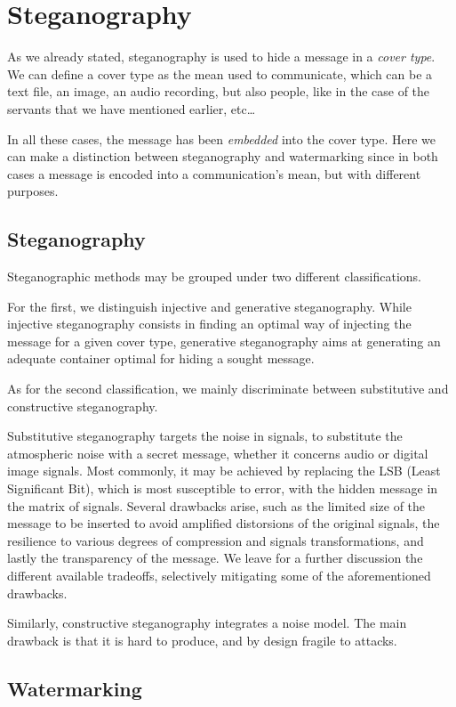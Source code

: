 \documentclass[../../main.tex]{subfiles}
\begin{document}
\section{Steganography}

As we already stated, steganography is used to hide a message in a
\emph{cover type}. We can define a cover type as the mean used to communicate,
which can be a text file, an image, an audio recording, but also people, like in
the case of the servants that we have mentioned earlier, etc\dots

In all these cases, the message has been \emph{embedded} into the cover type.
Here we can make a distinction between steganography and watermarking since in
both cases a message is encoded into a communication's mean, but with different
purposes.

\subsection{Steganography}

Steganographic methods may be grouped under two different classifications.

For the first, we distinguish injective and generative steganography.
While injective steganography consists in finding an optimal way of injecting
the message for a given cover type, generative steganography aims at generating
an adequate container optimal for hiding a sought message.

As for the second classification, we mainly discriminate between substitutive
and constructive steganography.

Substitutive steganography targets the noise in signals, to substitute the
atmospheric noise with a secret message, whether it concerns audio or digital
image signals.
Most commonly, it may be achieved by replacing the LSB (Least Significant Bit),
which is most susceptible to error, with the hidden message in the matrix of
signals.
Several drawbacks arise, such as the limited size of the message to be inserted
to avoid amplified distorsions of the original signals, the resilience to
various degrees of compression and signals transformations, and lastly the
transparency of the message.
We leave for a further discussion the different available tradeoffs, selectively
mitigating some of the aforementioned drawbacks. 

Similarly, constructive steganography integrates a noise model.
The main drawback is that it is hard to produce, and by design fragile to
attacks.

\subsection{Watermarking}

\pagebreak
\end{document}
